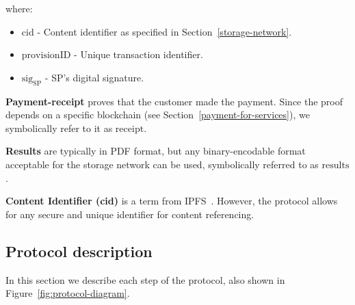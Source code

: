 \documentclass[pdftex,twocolumn,epjc3]{svjour3}
\begin{document}
{where:
\begin{itemize}
\item $\mathrm{cid}$ - Content identifier as specified in Section~\ref{storage-network}.
\item $\mathrm{provisionID}$ - Unique transaction identifier.
\item $\mathrm{sig}_\mathrm{SP}$ - SP's digital signature.
\end{itemize}

\noindent \textbf
{Payment-receipt}\label{payment-receipt} proves that the customer made the payment. Since the proof depends on a specific blockchain (see Section~\ref{payment-for-services}), we symbolically refer to it as $\mathrm{receipt}$.

\noindent \textbf{Results}\label{results} are typically in PDF format, but any binary-encodable format acceptable for the storage network can be used, symbolically referred to as $\mathrm{results}$.

\noindent \textbf{Content Identifier (cid)}\label{content-identifier-cid} is a term from IPFS~\cite{ipfsContentIdentifiersCIDs}. However, the protocol allows for any secure and unique identifier for content referencing.

\subsection{Protocol description}\label{protocol-description}

In this section we describe each step of the protocol, also shown in Figure~\ref{fig:protocol-diagram}.

}
\end{document}
